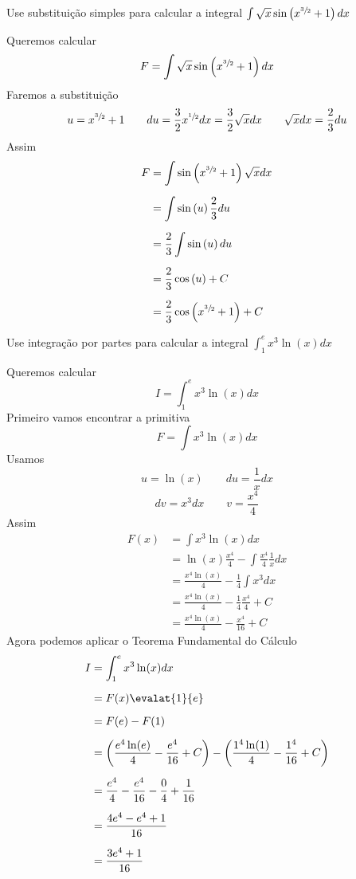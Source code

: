 \documentclass[a4paper,12pt,fleqn]{article}
\begin{document}

Use substituição simples para calcular a integral
\(
  \int \sqrt{x}\sin\left(x^{\sfrac{3}{2}}+1\right)dx
\)

\begin{answer}
  Queremos calcular
  \[
    F = \int \sqrt{x}\sin\left(x^{\sfrac{3}{2}}+1\right)dx
  \]
  Faremos a substituição
  \[
    u = x^{\sfrac{3}{2}}+1
    \qquad
    du = \frac{3}{2} x^{\sfrac{1}{2}} dx = \frac{3}{2} \sqrt{x} dx
    \qquad
     \sqrt{x} dx = \frac{2}{3} du
  \]
  Assim
  \begin{align*}
    F
    & = \int \sin\left(x^{\sfrac{3}{2}}+1\right) \sqrt{x} dx \\[2mm]
    & = \int \sin\left(u\right) \frac{2}{3} du \\[2mm]
    & = \frac{2}{3} \int \sin\left(u\right) du \\[2mm]
    & = \frac{2}{3} \cos\left(u\right) + C \\[2mm]
    & = \frac{2}{3} \cos\left(x^{\sfrac{3}{2}}+1\right) + C
  \end{align*}
  \clearpage
\end{answer}

Use integração por partes para calcular a integral
\(
\int_1^e x^3\ln(x) dx
\)

\begin{answer}
  Queremos calcular
  \[
    I = \int_1^e x^3\ln(x) dx
  \]
  Primeiro vamos encontrar a primitiva
  \[
    F = \int x^3\ln(x) dx
  \]
  Usamos
  \[
    u = \ln(x) \qquad du = \frac{1}{x} dx
  \]
  \[
    dv = x^3 dx \qquad v = \frac{x^4}{4}
  \]
  Assim
  \begin{align*}
    F(x)
    & = \int x^3 \ln(x) dx \\[2mm]
    & = \ln(x) \frac{x^4}{4} - \int \frac{x^4}{4} \frac{1}{x} dx \\[2mm]
    & = \frac{x^4\ln(x) }{4} - \frac{1}{4}\int x^3 dx \\[2mm]
    & = \frac{x^4\ln(x) }{4} - \frac{1}{4} \frac{x^4}{4} + C \\[2mm]
    & = \frac{x^4\ln(x) }{4} - \frac{x^4}{16} + C
  \end{align*}
  Agora podemos aplicar o Teorema Fundamental do Cálculo
  \begin{align*}
    I
    & = \int_1^e x^3\ln(x) dx \\[2mm]
    & = F(x)\evalat{1}{e} \\[2mm]
    & = F(e) - F(1) \\[2mm]
    & = \left(\frac{e^4\ln(e) }{4} - \frac{e^4}{16} + C\right)
      - \left(\frac{1^4\ln(1) }{4} - \frac{1^4}{16} + C\right) \\[2mm]
    & = \frac{e^4}{4} - \frac{e^4}{16}
      - \frac{0}{4}   + \frac{1}{16} \\[2mm]
    & = \frac{4e^4 - e^4 + 1}{16} \\[2mm]
    & = \frac{3e^4 + 1}{16}
  \end{align*}
  \clearpage
\end{answer}
\end{document}
